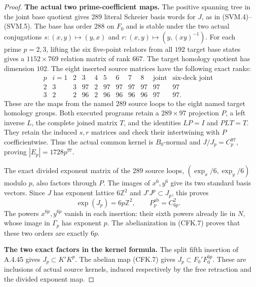 \begin{proof}
\par\medskip\noindent\textbf{The actual two prime-coefficient maps.}\quad
The positive spanning tree in the joint base quotient gives $289$
literal Schreier basis words for $J$, as in (SVM.4)--(SVM.5).
The base has order $288$ on $F_0$ and is stable under the two actual
conjugations
$s:(x,y)\mapsto(y,x)$ and
$r:(x,y)\mapsto(y,(xy)^{-1})$.
For each prime $p=2,3$, lifting the six five-point relators from
all $192$ target base states gives a $1152\times769$ relation matrix
of rank $667$.  The target homology quotient has dimension $102$.
The eight inserted source matrices have the following exact ranks:
\[
 \begin{array}{c|rrrrrrrr|r|r}
 p&i=1&2&3&4&5&6&7&8&\text{joint}&\text{six-deck joint}\\ \hline
 2&3&3&97&2&97&97&97&97&97&97\\
 3&2&2&96&2&96&96&96&96&97&97.
 \end{array}                                                   \tag{CFK.6}
\]
These are the maps from the named $289$ source loops to the eight
named target homology groups.  Both executed programs retain a
$289\times97$ projection $P$, a left inverse $L$, the complete
joined matrix $T$, and the identities $LP=I$ and $PLT=T$.
They retain the induced $s,r$ matrices and check their intertwining
with $P$ coefficientwise.  Thus the actual common kernel is
$B_0$-normal and $J/J_p=C_p^{97}$, proving
$|E_p|=1728p^{97}$.

The exact divided exponent matrix of the $289$ source loops,
$(\operatorname{exp}_x/6,\operatorname{exp}_y/6)$ modulo $p$,
also factors through $P$.  The images of $x^6,y^6$ give its two
standard basis vectors.  Since $J$ has exponent lattice
$6\mathbb Z^2$ and $J'J^p\subset J_p$, this proves
\[
       \operatorname{exp}(J_p)=6p\mathbb Z^2,
       \qquad P_p^{\mathrm{ab}}=C_{6p}^2.
                                                               \tag{CFK.7}
\]
The powers $x^{6p},y^{6p}$ vanish in each insertion: their sixth
powers already lie in $N$, whose image in $\Gamma_p$ has exponent
$p$.  The abelianization in (CFK.7) proves that these two orders
are exactly $6p$.

\par\medskip\noindent\textbf{The two exact factors in the kernel formula.}\quad
The split fifth insertion of A.4.45 gives
$J_p\subset K'K^p$.  The abelian map (CFK.7) gives
$J_p\subset F_0'F_0^{6p}$.
These are inclusions of actual source kernels, induced respectively
by the free retraction and the divided exponent map.


\end{proof}
